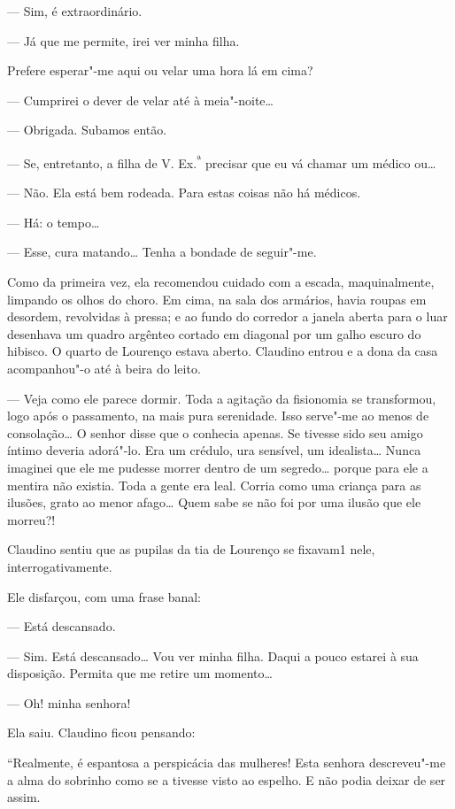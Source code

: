 --- Sim, é extraordinário.

--- Já que me permite, irei ver minha filha.

Prefere esperar"-me aqui ou velar uma hora lá em cima?

--- Cumprirei o dever de velar até à meia"-noite\ldots{}

--- Obrigada. Subamos então.

--- Se, entretanto, a filha de V. Ex.\textsuperscript{ª} precisar que eu
vá chamar um médico ou\ldots{}

--- Não. Ela está bem rodeada. Para estas coisas não há médicos.

--- Há: o tempo\ldots{}

--- Esse, cura matando\ldots{} Tenha a bondade de seguir"-me.

Como da primeira vez, ela recomendou cuidado com a escada,
maquinalmente, limpando os olhos do choro. Em cima, na sala dos
armários, havia roupas em desordem, revolvidas à pressa; e ao fundo do
corredor a janela aberta para o luar desenhava um quadro argênteo
cortado em diagonal por um galho escuro do hibisco. O quarto de Lourenço
estava aberto. Claudino entrou e a dona da casa acompanhou"-o até à beira
do leito.

--- Veja como ele parece dormir. Toda a agitação da fisionomia se
transformou, logo após o passamento, na mais pura serenidade. Isso
serve"-me ao menos de consolação\ldots{} O senhor disse que o conhecia apenas.
Se tivesse sido seu amigo íntimo deveria adorá"-lo. Era um crédulo, ura
sensível, um idealista\ldots{} Nunca imaginei que ele me pudesse morrer
dentro de um segredo\ldots{} porque para ele a mentira não existia. Toda a
gente era leal. Corria como uma criança para as ilusões, grato ao menor
afago\ldots{} Quem sabe se não foi por uma ilusão que ele morreu?!

Claudino sentiu que as pupilas da tia de Lourenço se fixavam1 nele,
interrogativamente.

Ele disfarçou, com uma frase banal:

--- Está descansado.

--- Sim. Está descansado\ldots{} Vou ver minha filha. Daqui a pouco estarei à
sua disposição. Permita que me retire um momento\ldots{}

--- Oh! minha senhora!

Ela saiu. Claudino ficou pensando:

``Realmente, é espantosa a perspicácia das mulheres! Esta senhora
descreveu"-me a alma do sobrinho como se a tivesse visto ao espelho. E
não podia deixar de ser assim.

